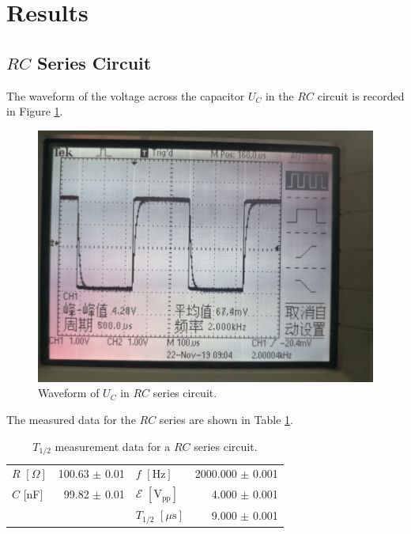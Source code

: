 \documentclass{article}
\begin{document}
\section{Results}

\subsection{$RC$ Series Circuit}

The waveform of the voltage across the capacitor $U_C$ in the $RC$ circuit is recorded in Figure \ref{FigRCC}.
\begin{figure}[H]\centering
    \includegraphics[scale=0.06]{1.jpg}
    \caption{Waveform of $U_C$ in $RC$ series circuit.}\label{FigRCC}
\end{figure}


The measured data for the $RC$ series are shown in Table \ref{TableRC}.

\begin{table}[H]
    \centering
    \begin{tabular}{lr|lr}
        \toprule
        $R\,\,[\Omega]$ & 100.63 $\pm$ 0.01 & $f\,\,[\text{Hz}]$                      & 2000.000 $\pm$ 0.001 \\
        $C$ [nF]        & 99.82 $\pm$ 0.01  & $\mathcal{E}\,\,[\text{V}_{\text{pp}}]$ & 4.000 $\pm$ 0.001    \\
                        &                   & $T_{1/2}\,\,[\mu\text{s}]$              & 9.000 $\pm$ 0.001    \\
        \bottomrule
    \end{tabular}
    \caption{$T_{1/2}$ measurement data for a $RC$ series circuit.\label{TableRC}}
\end{table}
\end{document}
